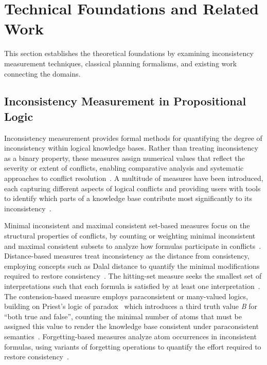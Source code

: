 \documentclass[proposal,english,palatino]{AIGpaper}
\begin{document}
\section{Technical Foundations and Related Work}

This section establishes the theoretical foundations by examining inconsistency measurement techniques, classical planning formalisms, and existing work connecting the domains.

\subsection{Inconsistency Measurement in Propositional Logic}

Inconsistency measurement provides formal methods for quantifying the degree of inconsistency within logical knowledge bases. Rather than treating inconsistency as a binary property, these measures assign numerical values that reflect the severity or extent of conflicts, enabling comparative analysis and systematic approaches to conflict resolution~\cite{Thimm2019}. A multitude of measures have been introduced, each capturing different aspects of logical conflicts and providing users with tools to identify which parts of a knowledge base contribute most significantly to its inconsistency~\cite{Thimm2018}.

Minimal inconsistent and maximal consistent set-based measures focus on the structural properties of conflicts, by counting or weighting minimal inconsistent and maximal consistent subsets to analyze how formulas participate in conflicts~\cite{Hunter2008}. Distance-based measures treat inconsistency as the distance from consistency, employing concepts such as Dalal distance to quantify the minimal modifications required to restore consistency~\cite{Grant2013,Grant2017}. The hitting-set measure seeks the smallest set of interpretations such that each formula is satisfied by at least one interpretation~\cite{Thimm2018}. The contension-based measure employs paraconsistent or many-valued logics, building on Priest's logic of paradox~\cite{Priest1979} which introduces a third truth value \emph{B} for ``both true and false'', counting the minimal number of atoms that must be assigned this value to render the knowledge base consistent under paraconsistent semantics~\cite{Grant2011,Thimm2018}. Forgetting-based measures analyze atom occurrences in inconsistent formulas, using variants of forgetting operations to quantify the effort required to restore consistency~\cite{Besnard2016}.
\end{document}
